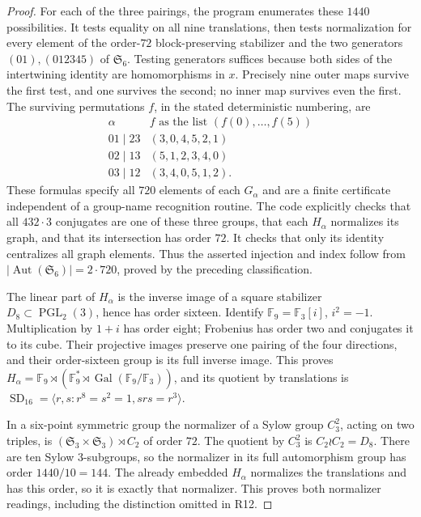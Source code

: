 \begin{proof}
For each of the three pairings, the program enumerates these $1440$
possibilities. It tests equality on all nine translations, then tests
normalization for every element of the order-$72$ block-preserving
stabilizer and the two generators $(01),(012345)$ of $\mathfrak S_6$.
Testing generators suffices because both sides of the intertwining
identity are homomorphisms in $x$. Precisely nine outer maps survive
the first test, and one survives the second; no inner map survives even
the first. The surviving permutations $f$, in the stated deterministic
numbering, are
\[
\begin{array}{c|c}
\alpha&f\text{ as the list }(f(0),\ldots,f(5))\\\hline
01\mid23&(3,0,4,5,2,1)\\
02\mid13&(5,1,2,3,4,0)\\
03\mid12&(3,4,0,5,1,2).
\end{array}
\]
These formulas specify all $720$ elements of each $G_\alpha$ and
are a finite certificate independent of a group-name recognition routine.
The code explicitly checks that all $432\cdot3$ conjugates are one of
these three groups, that each $H_\alpha$ normalizes its graph, and that
its intersection has order $72$. It checks that only its identity
centralizes all graph elements. Thus the asserted injection and index
follow from $|\operatorname{Aut}(\mathfrak S_6)|=2\cdot720$, proved
by the preceding classification.

The linear part of $H_\alpha$ is the inverse image of a square stabilizer
$D_8\subset\operatorname{PGL}_2(3)$, hence has order sixteen. Identify
$\mathbb F_9=\mathbb F_3[i]$, $i^2=-1$. Multiplication by $1+i$ has
order eight; Frobenius has order two and conjugates it to its cube.
Their projective images preserve one pairing of the four directions,
and their order-sixteen group is its full inverse image. This proves
$H_\alpha=\mathbb F_9\rtimes(\mathbb F_9^*\rtimes\operatorname{Gal}
(\mathbb F_9/\mathbb F_3))$, and its quotient by translations is
$\operatorname{SD}_{16}=\langle r,s:r^8=s^2=1,srs=r^3\rangle$.

In a six-point symmetric group the normalizer of a Sylow group
$C_3^2$, acting on two triples, is
$(\mathfrak S_3\times\mathfrak S_3)\rtimes C_2$ of order $72$.
The quotient by $C_3^2$ is $C_2\wr C_2=D_8$. There are ten Sylow
$3$-subgroups, so the normalizer in its full automorphism group has
order $1440/10=144$. The already embedded $H_\alpha$ normalizes the
translations and has this order, so it is exactly that normalizer.
This proves both normalizer readings, including the distinction omitted
in R12.
\end{proof}

